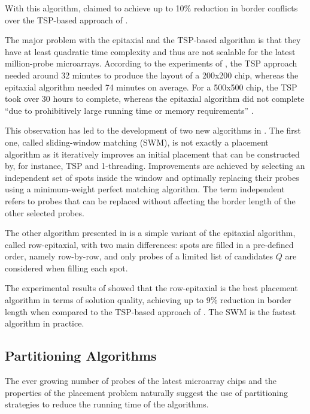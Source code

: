 \documentclass{bioinfo}
\begin{document}
With this algorithm, \citealp{KAHNG02} claimed to achieve up to 10\% reduction in border conflicts over the TSP-based approach of \citealp{HANNENHALLI02}.

The major problem with the epitaxial and the TSP-based algorithm is that they have at least quadratic time complexity and thus are not scalable for the latest million-probe microarrays. According to the experiments of \citealp{KAHNG03_1}, the TSP approach needed around 32 minutes to produce the layout of a 200x200 chip, whereas the epitaxial algorithm needed 74 minutes on average. For a 500x500 chip, the TSP took over 30 hours to complete, whereas the epitaxial algorithm did not complete ``due to prohibitively large running time or memory requirements'' \citep{KAHNG03_1}.

This observation has led to the development of two new algorithms in \citealp{KAHNG03_1}. The first one, called sliding-window matching (SWM), is not exactly a placement algorithm as it iteratively improves an initial placement that can be constructed by, for instance, TSP and 1-threading. Improvements are achieved by selecting an independent set of spots inside the window and optimally replacing their probes using a minimum-weight perfect matching algorithm. The term independent refers to probes that can be replaced without affecting the border length of the other selected probes.

The other algorithm presented in \citealp{KAHNG03_1} is a simple variant of the epitaxial algorithm, called row-epitaxial, with two main differences: spots are filled in a pre-defined order, namely row-by-row, and only probes of a limited list of candidates $Q$ are considered when filling each spot.

The experimental results of \citealp{KAHNG03_1} showed that the row-epitaxial is the best placement algorithm in terms of solution quality, achieving up to 9\% reduction in border length when compared to the TSP-based approach of \citealp{HANNENHALLI02}. The SWM is the fastest algorithm in practice.

\subsection{Partitioning Algorithms}
\label{sec:partition}

The ever growing number of probes of the latest microarray chips and the  properties of the placement problem naturally suggest the use of partitioning strategies to reduce the running time of the algorithms.
\end{document}
